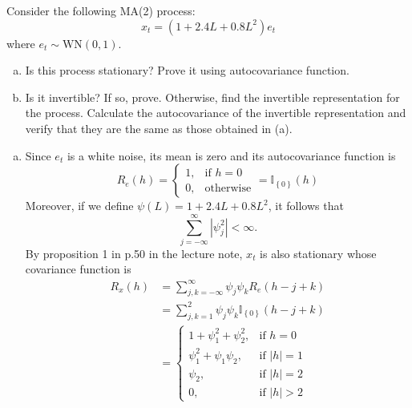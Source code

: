 \documentclass[answers]{exam}
\begin{document}
\newpage
{}

\begin{questions}
    \question
    Consider the following MA(2) process:
    \begin{equation}
      x_{t} = (1+2.4L+0.8L^{2})e_{t}
    \end{equation}
    where $e_{t} \sim \mathrm{WN}(0,1)$.
    \begin{enumerate}[(a)]
      \item Is this process stationary? Prove it using autocovariance function.
      \item Is it invertible? If so, prove. Otherwise, find the invertible representation for the process. Calculate the autocovariance of the invertible representation and verify that they are the same as those obtained in (a).
    \end{enumerate}
    \begin{solution}
      \begin{enumerate}[(a)]
        \item Since $e_{t}$ is a white noise, its mean is zero and its autocovariance function is
        \begin{equation}
          R_{e}(h) = \begin{cases}1, & \text{if $h=0$}\\ 0, & \text{otherwise} \end{cases}=\mathbb{I}_{\left\{0\right\}}(h)
        \end{equation}
        Moreover, if we define $\psi(L)=1+2.4L+0.8L^{2}$, it follows that
        \begin{equation}
          \sum_{j=-\infty}^{\infty}\left|\psi_{j}^{2}\right|<\infty.
        \end{equation}
        By proposition 1 in p.50 in the lecture note, $x_{t}$ is also stationary whose covariance function is
        \begin{align}
          R_{x}(h) &= \sum_{j,k=-\infty}^{\infty}\psi_{j}\psi_{k}R_{e}(h-j+k)\\
          &= \sum_{j,k=1}^{2}\psi_{j}\psi_{k}\mathbb{I}_{\left\{0\right\}}(h-j+k)\\
          &= \begin{cases}1+\psi_{1}^{2}+\psi_{2}^{2},& \text{if $h=0$}\\\psi_{1}^{2}+\psi_{1}\psi_{2}, & \text{if $|h|=1$}\\ \psi_{2}, & \text{if $|h|=2$}\\ 0, & \text{if $|h|>2$} \end{cases}

\end{align}
\end{enumerate}
\end{solution}
\end{questions}
\end{document}
